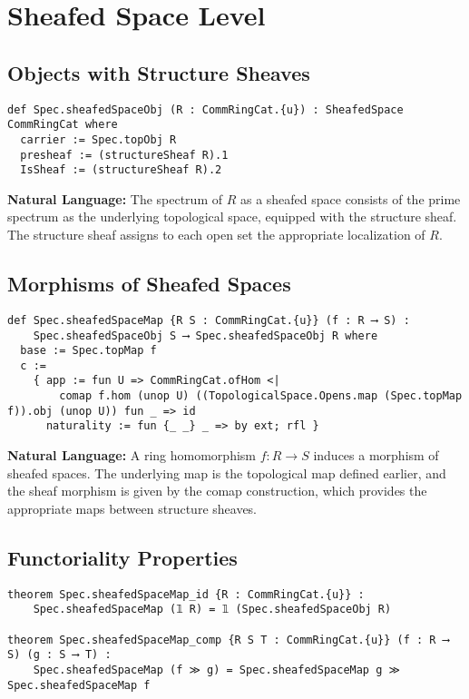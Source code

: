 \documentclass{article}
\theoremstyle{definition}
\begin{document}
\section{Sheafed Space Level}

\subsection{Objects with Structure Sheaves}

\begin{lstlisting}
def Spec.sheafedSpaceObj (R : CommRingCat.{u}) : SheafedSpace CommRingCat where
  carrier := Spec.topObj R
  presheaf := (structureSheaf R).1
  IsSheaf := (structureSheaf R).2
\end{lstlisting}

\textbf{Natural Language:} The spectrum of $R$ as a sheafed space consists of the prime spectrum as the underlying topological space, equipped with the structure sheaf. The structure sheaf assigns to each open set the appropriate localization of $R$.

\subsection{Morphisms of Sheafed Spaces}

\begin{lstlisting}
def Spec.sheafedSpaceMap {R S : CommRingCat.{u}} (f : R ⟶ S) :
    Spec.sheafedSpaceObj S ⟶ Spec.sheafedSpaceObj R where
  base := Spec.topMap f
  c :=
    { app := fun U => CommRingCat.ofHom <|
        comap f.hom (unop U) ((TopologicalSpace.Opens.map (Spec.topMap f)).obj (unop U)) fun _ => id
      naturality := fun {_ _} _ => by ext; rfl }
\end{lstlisting}

\textbf{Natural Language:} A ring homomorphism $f: R \to S$ induces a morphism of sheafed spaces. The underlying map is the topological map defined earlier, and the sheaf morphism is given by the comap construction, which provides the appropriate maps between structure sheaves.

\subsection{Functoriality Properties}

\begin{lstlisting}
theorem Spec.sheafedSpaceMap_id {R : CommRingCat.{u}} :
    Spec.sheafedSpaceMap (𝟙 R) = 𝟙 (Spec.sheafedSpaceObj R)

theorem Spec.sheafedSpaceMap_comp {R S T : CommRingCat.{u}} (f : R ⟶ S) (g : S ⟶ T) :
    Spec.sheafedSpaceMap (f ≫ g) = Spec.sheafedSpaceMap g ≫ Spec.sheafedSpaceMap f
\end{lstlisting}
\end{document}
